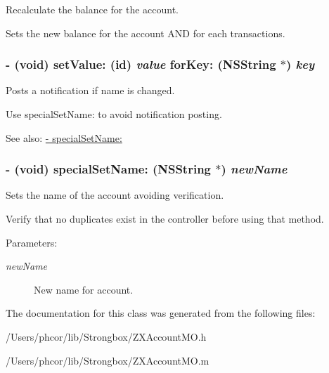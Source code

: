 Recalculate the balance for the account. 

Sets the new balance for the account AND for each transactions. \hypertarget{interface_z_x_account_m_o_8fe47f01576f4da7ad4212f4136ca67e}{
\subsubsection[{setValue:forKey:}]{\setlength{\rightskip}{0pt plus 5cm}- (void) setValue: (id) {\em value}\/ forKey: (NSString $\ast$) {\em key}}}
\label{interface_z_x_account_m_o_8fe47f01576f4da7ad4212f4136ca67e}


Posts a notification if name is changed. 

Use specialSetName: to avoid notification posting. \begin{Desc}
\item[See also:]\hyperlink{interface_z_x_account_m_o_d69b6f022ebdda0aee4b455c0040d45f}{- specialSetName:} \end{Desc}
\hypertarget{interface_z_x_account_m_o_d69b6f022ebdda0aee4b455c0040d45f}{
\subsubsection[{specialSetName:}]{\setlength{\rightskip}{0pt plus 5cm}- (void) specialSetName: (NSString $\ast$) {\em newName}}}
\label{interface_z_x_account_m_o_d69b6f022ebdda0aee4b455c0040d45f}


Sets the name of the account avoiding verification. 

Verify that no duplicates exist in the controller before using that method. \begin{Desc}
\item[Parameters:]
\begin{description}
\item[{\em newName}]New name for account. \end{description}
\end{Desc}


The documentation for this class was generated from the following files:\begin{CompactItemize}
\item 
/Users/phcor/lib/Strongbox/ZXAccountMO.h\item 
/Users/phcor/lib/Strongbox/ZXAccountMO.m\end{CompactItemize}

